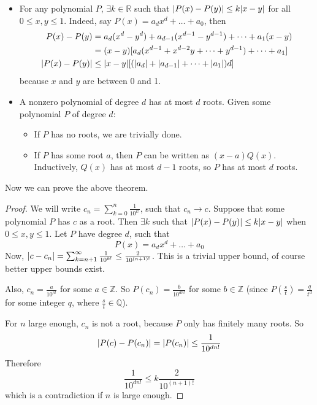 \begin{itemize}
	\item For any polynomial \(P\), \(\exists k \in \mathbb R\) such that \(\abs{P(x) - P(y)} \leq k\abs{x-y}\) for all \(0 \leq x, y \leq 1\).
	      Indeed, say \(P(x) = a_d x^d + \dots + a_0\), then
	      \begin{align*}
		      P(x) - P(y)       & = a_d(x^d - y^d) + a_{d-1}(x^{d-1} - y^{d-1}) + \dots + a_1(x-y)     \\
		                        & = (x-y) [ a_d(x^{d-1} + x^{d-2}y + \dots + y^{d-1}) + \dots + a_1 ] \\
		      \abs{P(x) - P(y)} & \leq \abs{x-y} [ (\abs{a_d} + \abs{a_{d-1}} + \dots + \abs{a_1})d ]
	      \end{align*}
	      because \(x\) and \(y\) are between 0 and 1.
	\item A nonzero polynomial of degree \(d\) has at most \(d\) roots.
	      Given some polynomial \(P\) of degree \(d\):
	      \begin{itemize}
		      \item If \(P\) has no roots, we are trivially done.
		      \item If \(P\) has some root \(a\), then \(P\) can be written as \((x-a)Q(x)\).
		            Inductively, \(Q(x)\) has at most \(d-1\) roots, so \(P\) has at most \(d\) roots.
	      \end{itemize}
\end{itemize}
Now we can prove the above theorem.
\begin{proof}
	We will write \(c_n = \sum_{k=0}^n \frac{1}{10^{k!}}\), such that \(c_n \to c\).
	Suppose that some polynomial \(P\) has \(c\) as a root.
	Then \(\exists k\) such that \(\abs{P(x) - P(y)} \leq k\abs{x-y}\) when \(0 \leq x, y \leq 1\).
	Let \(P\) have degree \(d\), such that
	\[
		P(x) = a_d x^d + \dots + a_0
	\]
	Now, \(\abs{c - c_n} = \sum_{k=n+1}^\infty \frac{1}{10^{k!}} \leq \frac{2}{10^{(n+1)!}}\).
	This is a trivial upper bound, of course better upper bounds exist.

	Also, \(c_n = \frac{a}{10^{n!}}\) for some \(a \in \mathbb Z\).
	So \(P(c_n) = \frac{b}{10^{dn!}}\) for some \(b \in \mathbb Z\) (since \(P(\frac{s}{t}) = \frac{q}{t^d}\) for some integer \(q\), where \(\frac{s}{t} \in \mathbb Q\)).

	For \(n\) large enough, \(c_n\) is not a root, because \(P\) only has finitely many roots.
	So
	\[
		\abs{P(c) - P(c_n)} = \abs{P(c_n)} \leq \frac{1}{10^{dn!}}
	\]
	Therefore
	\[
		\frac{1}{10^{dn!}} \leq k\frac{2}{10^{(n+1)!}}
	\]
	which is a contradiction if \(n\) is large enough.
\end{proof}
